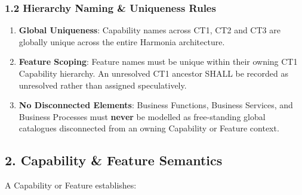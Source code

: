 \label{rad:metamodel:73}
\subsubsection*{1.2 Hierarchy Naming \& Uniqueness Rules}
\label{rad:metamodel:74}

\begin{enumerate}

\item
\textbf{Global Uniqueness}: Capability names across CT1, CT2 and CT3 are globally unique across the entire Harmonia architecture.



\item
\textbf{Feature Scoping}: Feature names must be unique within their owning CT1 Capability hierarchy. An unresolved CT1 ancestor SHALL be recorded as unresolved rather than assigned speculatively.



\item
\textbf{No Disconnected Elements}: Business Functions, Business Services, and Business Processes must \textbf{never} be modelled as free-standing global catalogues disconnected from an owning Capability or Feature context.



\end{enumerate}
\label{rad:metamodel:78}

\par\smallskip
{}\label{rad:metamodel:80}
\subsection*{2. Capability \& Feature Semantics}
\label{rad:metamodel:82}

A Capability or Feature establishes:

\label{rad:metamodel:83}

